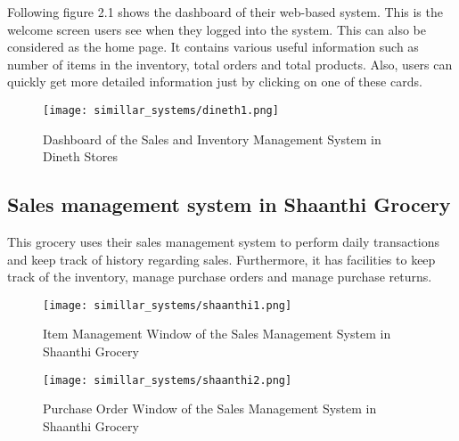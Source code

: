 \documentclass[12pt]{report}
\begin{document}
Following figure 2.1 shows the dashboard of their web-based system. This is the welcome screen users see when they logged into the system. This can also be considered as the home page. It contains various useful information such as number of items in the inventory, total orders and total products. Also, users can quickly get more detailed information just by clicking on one of these cards.

\begin{figure}[H]
	\centering
	\texttt{[image: simillar\_systems/dineth1.png]}
	\caption{Dashboard of the Sales and Inventory Management System in Dineth Stores}
\end{figure}

\subsection{Sales management system in Shaanthi Grocery}

This grocery uses their sales management system to perform daily transactions and keep track of history regarding sales.  Furthermore, it has facilities to keep track of the inventory, manage purchase orders and manage purchase returns.

\begin{figure}[H]
	\centering
	\texttt{[image: simillar\_systems/shaanthi1.png]}
	\caption{Item Management Window of the Sales Management System in Shaanthi Grocery}
\end{figure}

\begin{figure}[H]
	\centering
	\texttt{[image: simillar\_systems/shaanthi2.png]}
	\caption{Purchase Order Window of the Sales Management System in Shaanthi Grocery}
\end{figure}
\end{document}
